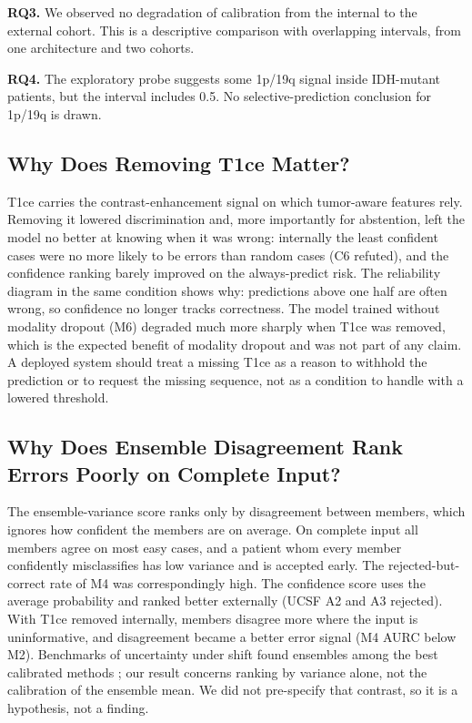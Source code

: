 \documentclass[journal]{IEEEtran}
\begin{document}
\textbf{RQ3.} We observed no degradation of calibration from the internal to the external cohort. This is a descriptive comparison with overlapping intervals, from one architecture and two cohorts.

\textbf{RQ4.} The exploratory probe suggests some 1p/19q signal inside IDH-mutant patients, but the interval includes 0.5. No selective-prediction conclusion for 1p/19q is drawn.

\subsection{Why Does Removing T1ce Matter?}
T1ce carries the contrast-enhancement signal on which tumor-aware features rely. Removing it lowered discrimination and, more importantly for abstention, left the model no better at knowing when it was wrong: internally the least confident cases were no more likely to be errors than random cases (C6 refuted), and the confidence ranking barely improved on the always-predict risk. The reliability diagram in the same condition shows why: predictions above one half are often wrong, so confidence no longer tracks correctness. The model trained without modality dropout (M6) degraded much more sharply when T1ce was removed, which is the expected benefit of modality dropout \cite{neverova2016} and was not part of any claim. A deployed system should treat a missing T1ce as a reason to withhold the prediction or to request the missing sequence, not as a condition to handle with a lowered threshold.

\subsection{Why Does Ensemble Disagreement Rank Errors Poorly on Complete Input?}
The ensemble-variance score ranks only by disagreement between members, which ignores how confident the members are on average. On complete input all members agree on most easy cases, and a patient whom every member confidently misclassifies has low variance and is accepted early. The rejected-but-correct rate of M4 was correspondingly high. The confidence score uses the average probability and ranked better externally (UCSF A2 and A3 rejected). With T1ce removed internally, members disagree more where the input is uninformative, and disagreement became a better error signal (M4 AURC below M2). Benchmarks of uncertainty under shift found ensembles among the best calibrated methods \cite{ovadia2019}; our result concerns ranking by variance alone, not the calibration of the ensemble mean. We did not pre-specify that contrast, so it is a hypothesis, not a finding.
\end{document}
